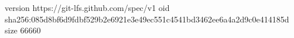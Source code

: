 version https://git-lfs.github.com/spec/v1
oid sha256:085d8bf6d9fdbf529b2e6921e3e49ec551c4541bd3462ee6a4a2d9c0e414185d
size 66660
